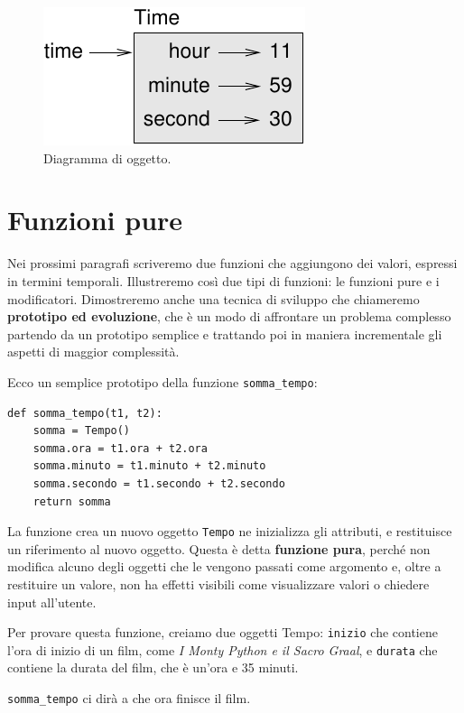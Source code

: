 \documentclass[10pt]{book}
\begin{document}
\begin{figure}
\centerline
{\includegraphics[scale=0.8]{figs/time.pdf}}
\caption{Diagramma di oggetto.}
\label{fig.time}
\end{figure}


\section{Funzioni pure}

Nei prossimi paragrafi scriveremo due funzioni che aggiungono dei valori, espressi in termini temporali. Illustreremo così due tipi di funzioni: le funzioni pure e i modificatori. Dimostreremo anche una tecnica di sviluppo che chiameremo {\bf prototipo ed evoluzione}, che è un modo di affrontare un problema complesso partendo da un prototipo semplice e trattando poi in maniera incrementale gli aspetti di maggior complessità.

Ecco un semplice prototipo della funzione \verb"somma_tempo":

\begin{verbatim}
def somma_tempo(t1, t2):
    somma = Tempo()
    somma.ora = t1.ora + t2.ora
    somma.minuto = t1.minuto + t2.minuto
    somma.secondo = t1.secondo + t2.secondo
    return somma
\end{verbatim}
%
La funzione crea un nuovo oggetto {\tt Tempo}  ne inizializza gli attributi, e restituisce un riferimento al nuovo oggetto. Questa è detta {\bf funzione pura},  perché non modifica alcuno degli oggetti che le vengono passati come argomento e, oltre a restituire un valore, non ha effetti visibili come visualizzare valori o chiedere input all'utente.

Per provare questa funzione, creiamo due oggetti Tempo: {\tt inizio}
che contiene l'ora di inizio di un film, come {\em I Monty Python e il Sacro Graal}, e {\tt durata} che contiene la durata del film, che è un'ora e 35 minuti.

\verb"somma_tempo" ci dirà a che ora finisce il film.
\end{document}
